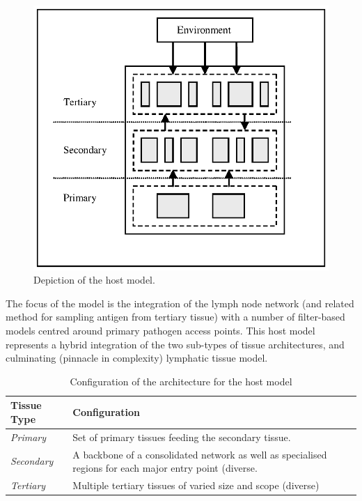 \begin{figure}[ht]
	\centering
	\includegraphics[scale=0.75]{Tissues/tissues-models-host}
	\caption{Depiction of the host model.}
	\label{pic:tissues:architecture:host}
\end{figure}

The focus of the model is the integration of the lymph node network (and related method for sampling antigen from tertiary tissue) with a number of filter-based models centred around primary pathogen access points. This host model represents a hybrid integration of the two sub-types of tissue architectures, and culminating (pinnacle in complexity) lymphatic tissue model.

\begin{table}[ht]
	\centering\small
		\begin{tabularx}{\textwidth}{lX}
		\toprule
		\textbf{Tissue Type} & \textbf{Configuration} \\
		\toprule
		\emph{Primary} & Set of primary tissues feeding the secondary tissue. \\
		\emph{Secondary} & A backbone of a consolidated network as well as specialised regions for each major entry point (diverse.  \\
		\emph{Tertiary} & Multiple tertiary tissues of varied size and scope (diverse)  \\
		\bottomrule
		\end{tabularx}		
	\caption{Configuration of the architecture for the host model}
	\label{tab:tissue:architectures:host}
\end{table}

